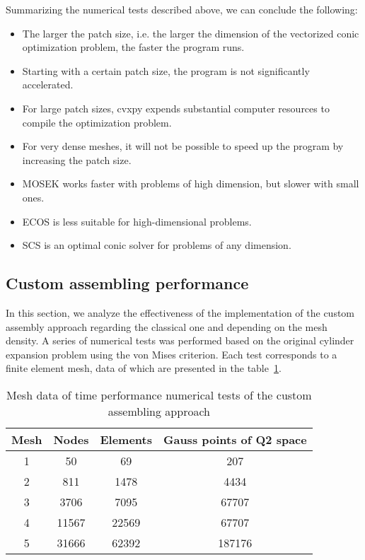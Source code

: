 \documentclass[12pt]{article}
\begin{document}
Summarizing the numerical tests described above, we can conclude the following:
\begin{itemize}
    \item The larger the patch size, i.e. the larger the dimension of the vectorized conic optimization problem, the faster the program runs.
    \item Starting with a certain patch size, the program is not significantly accelerated.
    \item For large patch sizes, cvxpy expends substantial computer resources to compile the optimization problem.
    \item For very dense meshes, it will not be possible to speed up the program by increasing the patch size.
    \item MOSEK works faster with problems of high dimension, but slower with small ones.
    \item ECOS is less suitable for high-dimensional problems.
    \item SCS is an optimal conic solver for problems of any dimension.
\end{itemize}

\subsection{Custom assembling performance}

In this section, we analyze the effectiveness of the implementation of the custom assembly approach regarding the classical one and depending on the mesh density. A series of numerical tests was performed based on the original cylinder expansion problem using the von Mises criterion. Each test corresponds to a finite element mesh, data of which are presented in the table~\ref{tab:custom_assembling_tests}. 

\begin{table}[H]
	\centering
	\begin{tabular}{|cccc|}
		\hline
		Mesh & Nodes & Elements & Gauss points of Q2 space \\
		\hline
		1 & 50	& 69 & 207 \\
		2 & 811 & 1478 & 4434 \\
		3 & 3706 & 7095 & 67707 \\
		4 & 11567 & 22569 & 67707 \\
		5 & 31666 & 62392 & 187176 \\
		\hline
	\end{tabular}
	\caption{Mesh data of time performance numerical tests of the custom assembling approach}
    \label{tab:custom_assembling_tests}
\end{table}
\end{document}
